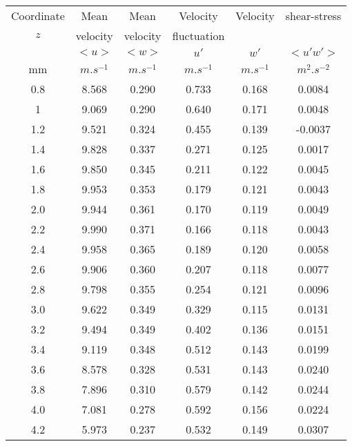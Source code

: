 \begin{table}[H]
\begin{center}
\begin{tabular}{|c|c|c|c|c|c|} \hline
 Coordinate & Mean  & Mean  &  Velocity & Velocity & shear-stress  \\
    $z$       & velocity & velocity   & fluctuation   &   &    \\
              & $<u>$   &  $<w>$    &  $u'$        &    $w'$    &  $<u'w'>$   \\
  \hline
      mm    &  $m.s^{-1}$   &   $m.s^{-1}$  & $m.s^{-1}$  &  $m.s^{-1}$ &$m^{2}.s^{-2}$\\ \hline
     0.8    & 8.568 &  0.290 & 0.733 & 0.168  &  0.0084 \\   \hline
     1      & 9.069 &  0.290 & 0.640 & 0.171  &  0.0048 \\   \hline
     1.2    & 9.521 &  0.324 & 0.455 & 0.139  & -0.0037 \\   \hline
     1.4    & 9.828 &  0.337 & 0.271 & 0.125  &  0.0017 \\   \hline
     1.6    & 9.850 &  0.345 & 0.211 & 0.122  &  0.0045 \\   \hline
     1.8    & 9.953 &  0.353 & 0.179 & 0.121  &  0.0043 \\   \hline
     2.0    & 9.944 &  0.361 & 0.170 & 0.119  &  0.0049 \\   \hline
     2.2    & 9.990 &  0.371 & 0.166 & 0.118  &  0.0043 \\   \hline
     2.4    & 9.958 &  0.365 & 0.189 & 0.120  &  0.0058 \\   \hline
     2.6    & 9.906 &  0.360 & 0.207 & 0.118  &  0.0077 \\   \hline
     2.8    & 9.798 &  0.355 & 0.254 & 0.121  &  0.0096 \\   \hline
     3.0    & 9.622 &  0.349 & 0.329 & 0.115  &  0.0131 \\   \hline
     3.2    & 9.494 &  0.349 & 0.402 & 0.136  &  0.0151 \\   \hline
     3.4    & 9.119 &  0.348 & 0.512 & 0.143  &  0.0199 \\   \hline
     3.6    & 8.578 &  0.328 & 0.531 & 0.143  &  0.0240 \\   \hline
     3.8    & 7.896 &  0.310 & 0.579 & 0.142  &  0.0244 \\   \hline
     4.0    & 7.081 &  0.278 & 0.592 & 0.156  &  0.0224 \\   \hline
     4.2    & 5.973 &  0.237 & 0.532 & 0.149  &  0.0307 \\   \hline

\end{tabular}
\end{center}
\end{table}
